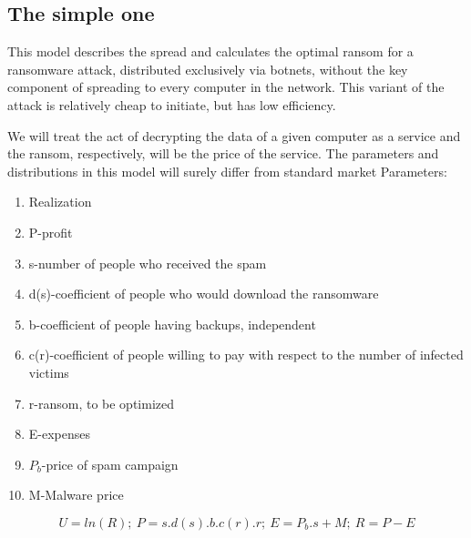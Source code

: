 \documentclass[11pt, a4paper]{article}
\begin{document}
	\subsection{The simple one}
		This model describes the spread and calculates the optimal ransom for a ransomware attack, distributed exclusively via botnets, without the key component of spreading to every computer in the network. This variant of the attack is relatively cheap to initiate, but has low efficiency.\par
		We will treat the act of decrypting the data of a given computer as a service and the ransom, respectively, will be the price of the service. The parameters and distributions in this model will surely differ from standard market 
		Parameters:
		\begin{enumerate}
			\item Realization
			\item P-profit
			\item s-number of people who received the spam
			\item d(s)-coefficient of people who would download the ransomware
			\item b-coefficient of people having backups, independent
			\item c(r)-coefficient of people willing to pay with respect to the number of infected victims
			\item r-ransom, to be optimized
			\item E-expenses
			\item $P_{b}$-price of spam campaign
			\item M-Malware price
		\end{enumerate}
		$$U=ln(R);\ P=s.d(s).b.c(r).r;\ E=P_{b}.s+M;\ R=P-E$$		
\nocite{*}


\end{document}
